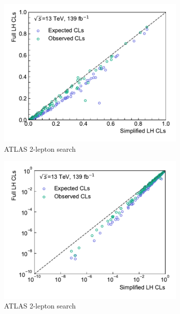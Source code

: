 \begin{figure}
\begin{subfigure}[b]{0.5\textwidth}
		\centering\includegraphics[width=\textwidth]{cls_scatter_2L0J_lin}
		\caption{ATLAS 2-lepton search~\cite{SUSY-2018-32}}
	\end{subfigure}\hfill
	\begin{subfigure}[b]{0.5\textwidth}
		\centering\includegraphics[width=\textwidth]{cls_scatter_2L0J_log}
		\caption{ATLAS 2-lepton search~\cite{SUSY-2018-32}}
	\end{subfigure}\hfill
	\caption{}\label{fig:app_results_cls_1}
\end{figure}


